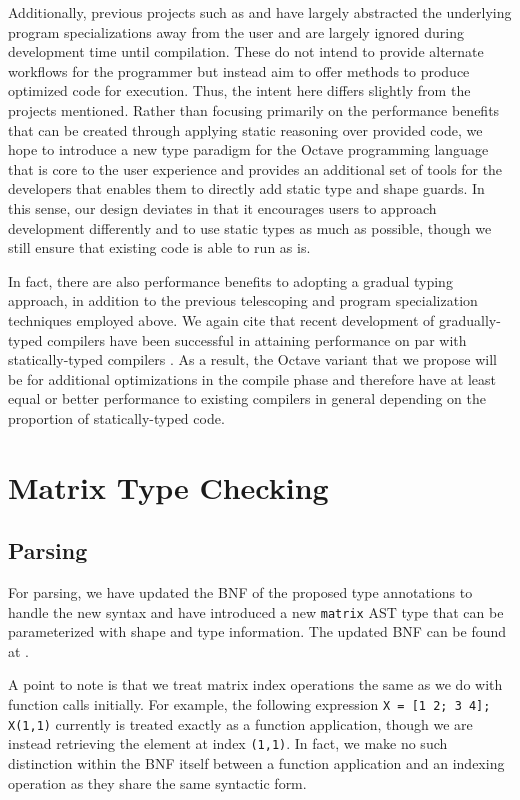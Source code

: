 Additionally, previous projects such as \citet{chauhan2003type} and \citet{olmos2003turning} have largely abstracted the underlying program specializations away from the user and are largely ignored during development time until compilation. These do not intend to provide alternate workflows for the programmer but instead aim to offer methods to produce optimized code for execution. Thus, the intent here differs slightly from the projects mentioned. Rather than focusing primarily on the performance benefits that can be created through applying static reasoning over provided code, we hope to introduce a new type paradigm for the Octave programming language that is core to the user experience and provides an additional set of tools for the developers that enables them to directly add static type and shape guards. In this sense, our design deviates in that it encourages users to approach development differently and to use static types as much as possible, though we still ensure that existing code is able to run as is.

In fact, there are also performance benefits to adopting a gradual typing approach, in addition to the previous telescoping and program specialization techniques employed above. We again cite that recent development of gradually-typed compilers have been successful in attaining performance on par with statically-typed compilers \cite{kuhlenschmidt2018efficient}. As a result, the Octave variant that we propose will be for additional optimizations in the compile phase and therefore have at least equal or better performance to existing compilers in general depending on the proportion of statically-typed code.

\section{Matrix Type Checking}

\subsection{Parsing}
For parsing, we have updated the BNF of the proposed type annotations to handle the new syntax and have introduced a new {\tt matrix} AST type that can be parameterized with shape and type information. The updated BNF can be found at \cite{yuchong2018gradual}.

A point to note is that we treat matrix index operations the same as we do with function calls initially. For example, the following expression {\tt X = [1 2; 3 4]; X(1,1)} currently is treated exactly as a function application, though we are instead retrieving the element at index {\tt(1,1)}. In fact, we make no such distinction within the BNF itself between a function application and an indexing operation as they share the same syntactic form.

